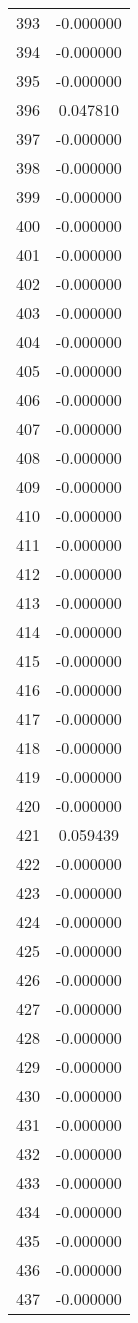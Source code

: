 \documentclass[12pt]{article}
\begin{document}
\begin{longtable}{@{}cc@{}}
393 & -0.000000 \\
394 & -0.000000 \\
395 & -0.000000 \\
396 & 0.047810 \\
397 & -0.000000 \\
398 & -0.000000 \\
399 & -0.000000 \\
400 & -0.000000 \\
401 & -0.000000 \\
402 & -0.000000 \\
403 & -0.000000 \\
404 & -0.000000 \\
405 & -0.000000 \\
406 & -0.000000 \\
407 & -0.000000 \\
408 & -0.000000 \\
409 & -0.000000 \\
410 & -0.000000 \\
411 & -0.000000 \\
412 & -0.000000 \\
413 & -0.000000 \\
414 & -0.000000 \\
415 & -0.000000 \\
416 & -0.000000 \\
417 & -0.000000 \\
418 & -0.000000 \\
419 & -0.000000 \\
420 & -0.000000 \\
421 & 0.059439 \\
422 & -0.000000 \\
423 & -0.000000 \\
424 & -0.000000 \\
425 & -0.000000 \\
426 & -0.000000 \\
427 & -0.000000 \\
428 & -0.000000 \\
429 & -0.000000 \\
430 & -0.000000 \\
431 & -0.000000 \\
432 & -0.000000 \\
433 & -0.000000 \\
434 & -0.000000 \\
435 & -0.000000 \\
436 & -0.000000 \\
437 & -0.000000 \\

\end{longtable}
\end{document}
